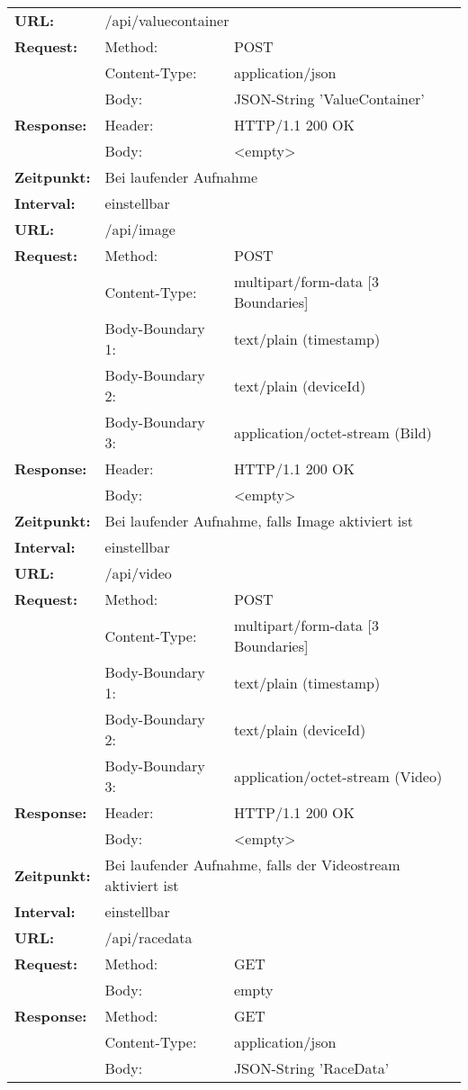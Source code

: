 {\begin{longtable}{ p{2.5cm} p{3.5cm} p{7cm}}
	\textbf{URL:} & \multicolumn{2}{p{10cm}}{/api/valuecontainer} \\
	\textbf{Request:} & Method: & POST \\
		& Content-Type: & application/json \\
		& Body: & JSON-String 'ValueContainer' \\
	\textbf{Response:} & Header: & HTTP/1.1 200 OK \\
		& Body: & <empty> \\
	\textbf{Zeitpunkt:} & \multicolumn{2}{p{10cm}}{Bei laufender Aufnahme} \\ 
	\textbf{Interval:} & \multicolumn{2}{p{10cm}}{einstellbar} \\
\hline
\hline
	\textbf{URL:} & \multicolumn{2}{p{10cm}}{/api/image} \\
	\textbf{Request:} & Method: & POST \\
		& Content-Type: & multipart/form-data [3 Boundaries] \\
		& Body-Boundary 1: & text/plain (timestamp) \\
		& Body-Boundary 2: & text/plain (deviceId) \\
		& Body-Boundary 3: & application/octet-stream (Bild) \\
	\textbf{Response:} & Header: & HTTP/1.1 200 OK \\
		& Body: & <empty> \\
	\textbf{Zeitpunkt:} & \multicolumn{2}{p{10cm}}{Bei laufender Aufnahme, falls Image aktiviert ist} \\ 
	\textbf{Interval:} & \multicolumn{2}{p{10cm}}{einstellbar} \\
\hline
\hline
	\textbf{URL:} & \multicolumn{2}{p{10cm}}{/api/video} \\
	\textbf{Request:} & Method: & POST \\
		& Content-Type: & multipart/form-data [3 Boundaries] \\
		& Body-Boundary 1: & text/plain (timestamp) \\
		& Body-Boundary 2: & text/plain (deviceId) \\
		& Body-Boundary 3: & application/octet-stream (Video) \\
	\textbf{Response:} & Header: & HTTP/1.1 200 OK \\
		& Body: & <empty> \\
	\textbf{Zeitpunkt:} & \multicolumn{2}{p{10cm}}{Bei laufender Aufnahme, falls der Videostream aktiviert ist} \\ 
	\textbf{Interval:} & \multicolumn{2}{p{10cm}}{einstellbar} \\
\hline
\hline
	\textbf{URL:} & \multicolumn{2}{p{10cm}}{/api/racedata} \\
	\textbf{Request:} & Method: & GET \\
		& Body: & empty\\	
	\textbf{Response:} & Method: & GET \\
		& Content-Type: & application/json \\
		& Body: & JSON-String 'RaceData' \\	
	

\end{longtable}}
